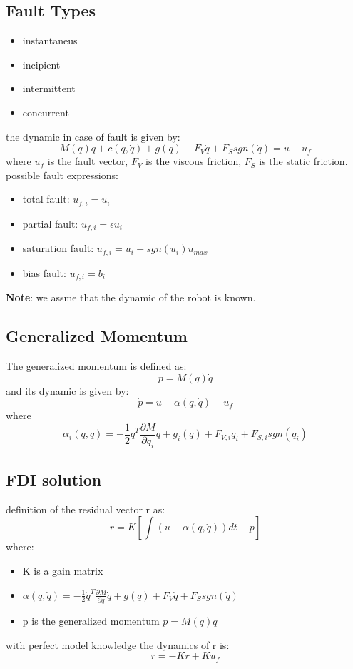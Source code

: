 \documentclass[a4paper,12pt]{article}
\begin{document}
\subsection{Fault Types }
\begin{itemize}
    \item instantaneus 
    \item incipient
    \item intermittent
    \item concurrent 
\end{itemize}
the dynamic in case of fault is given by:
\begin{equation}
M(q)\ddot{q}+c(q,\dot{q})+g(q)+F_{V}\dot{q}+F_{S}sgn(\dot{q})=u - u_f
\end{equation}
where $u_f$ is the fault vector, $F_{V}$ is the viscous friction,
$F_{S}$ is the static friction.\\
possible fault expressions:
\begin{itemize}
    \item total fault: $u_{f,i}=u_{i}$
    \item partial fault: $u_{f,i}=\epsilon u_{i}$
    \item saturation fault: $u_{f,i}=u_{i}-sgn(u_{i})u_{max}$
    \item bias fault: $u_{f,i}=b_i$
\end{itemize}
\textbf{Note}: we assme that the dynamic of the robot is known.
\subsection{Generalized Momentum}
The generalized momentum is defined as:
\begin{equation}
p=M(q)\dot{q}
\end{equation}
and its dynamic is given by:
\begin{equation}
\dot{p}=u - \alpha(q,\dot{q}) - u_f
\end{equation}
where \begin{equation}\label{eq:alpha}
\alpha_i(q,\dot{q})=-\frac{1}{2}\dot{q}^T\frac{\partial M}{\partial q_i}\dot{q}+g_i(q)+F_{V,i}\dot{q}_i+F_{S,i}sgn(\dot{q}_i)
\end{equation}

\subsection{FDI solution}
definition of the residual vector r as:
\begin{equation}
r=K[\int(u-\alpha(q,\dot{q}))dt-p]
\end{equation}
where:
\begin{itemize}
    \item K is a gain matrix
    \item $\alpha(q,\dot{q})=-\frac{1}{2}\dot{q}^T\frac{\partial M}{\partial q}\dot{q}+g(q)+F_{V}\dot{q}+F_{S}sgn(\dot{q})$
    \item p is the generalized momentum $p = M(q)\dot{q}$
\end{itemize}
with perfect model knowledge the dynamics of r is: \begin{equation}
\dot{r}=-Kr + Ku_f
\end{equation}
\end{document}
